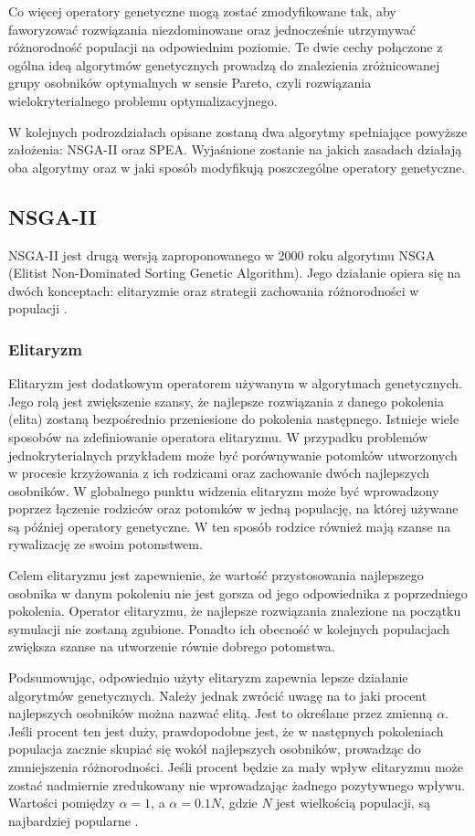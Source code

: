 \documentclass[twoside]{iisthesis}
\begin{document}
Co więcej operatory genetyczne mogą zostać zmodyfikowane tak, aby faworyzować rozwiązania niezdominowane oraz jednocześnie utrzymywać różnorodność populacji na odpowiednim poziomie. Te dwie cechy połączone z ogólna ideą algorytmów genetycznych prowadzą do znalezienia zróżnicowanej grupy osobników optymalnych w sensie Pareto, czyli rozwiązania wielokryterialnego problemu optymalizacyjnego.

W kolejnych podrozdziałach opisane zostaną dwa algorytmy spełniające powyższe założenia: NSGA-II oraz SPEA. Wyjaśnione zostanie na jakich zasadach działają oba algorytmy oraz w jaki sposób modyfikują poszczególne operatory genetyczne.
\subsection{NSGA-II}
NSGA-II jest drugą wersją zaproponowanego w 2000 roku algorytmu NSGA (Elitist Non-Dominated Sorting Genetic Algorithm). Jego działanie opiera się na dwóch konceptach: elitaryzmie oraz strategii zachowania różnorodności w populacji \cite{nsga}. 

\subsubsection{Elitaryzm}
Elitaryzm jest dodatkowym operatorem używanym w algorytmach genetycznych. Jego rolą jest zwiększenie szansy, że najlepsze rozwiązania z danego pokolenia (elita) zostaną bezpośrednio przeniesione do pokolenia następnego. Istnieje wiele sposobów na zdefiniowanie operatora elitaryzmu. W przypadku problemów jednokryterialnych przykładem może być porównywanie potomków utworzonych w procesie krzyżowania z ich rodzicami oraz zachowanie dwóch najlepszych osobników. W globalnego punktu widzenia elitaryzm może być wprowadzony poprzez łączenie rodziców oraz potomków w jedną populację, na której używane są później operatory genetyczne. W ten sposób rodzice również mają szanse na rywalizację ze swoim potomstwem.

Celem elitaryzmu jest zapewnienie, że wartość przystosowania najlepszego osobnika w danym pokoleniu nie jest gorsza od jego odpowiednika z poprzedniego pokolenia. Operator elitaryzmu, że najlepsze rozwiązania znalezione na początku symulacji nie zostaną zgubione. Ponadto ich obecność w kolejnych populacjach zwiększa szanse na utworzenie równie dobrego potomstwa. 

Podsumowując, odpowiednio użyty elitaryzm zapewnia lepsze działanie algorytmów genetycznych. Należy jednak zwrócić uwagę na to jaki procent najlepszych osobników można nazwać elitą. Jest to określane przez zmienną $\alpha$. Jeśli procent ten jest duży, prawdopodobne jest, że w następnych pokoleniach populacja zacznie skupiać się wokół najlepszych osobników, prowadząc do zmniejszenia różnorodności. Jeśli procent będzie za mały wpływ elitaryzmu może zostać nadmiernie zredukowany nie wprowadzając żadnego pozytywnego wpływu. Wartości pomiędzy $\alpha = 1$, a $\alpha = 0.1N$, gdzie $N$ jest wielkością populacji, są najbardziej popularne \cite{book}.\\
\end{document}
